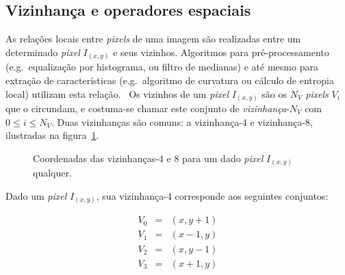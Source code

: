 \subsection{Vizinhança e operadores espaciais}

As relações locais entre \textit{pixels} de uma imagem são realizadas
entre um determinado \textit{pixel} $I_{(x,y)}$ e seus
vizinhos. Algoritmos para pré-processamento (e.g.\ equalização por
histograma, ou filtro de medianas) e até mesmo para extração de
características (e.g.\ algoritmo de curvatura ou cálculo de entropia
local) utilizam esta relação.~\cite{gonzalez} Os vizinhos de
um \textit{pixel} $I_{(x,y)}$ são os $N_V$ \textit{pixels} $V_i$ que o
circundam, e costuma-se chamar este conjunto
de \emph{vizinhança}-$N_V$ com $0 \leq i \leq N_V$. Duas vizinhanças
são comuns: a vizinhança-4 e vizinhança-8, ilustradas na figura~\ref{fig:vizinhanca}. 

\begin{figure}[ht!]
\begin{center}
      \caption{Coordenadas das vizinhanças-$4$ e $8$ para um dado \textit{pixel}
        $I_{(x,y)}$ qualquer.}
        \label{fig:vizinhanca}

\hspace{2pc}
\fonteminha
\end{center}
\end{figure}

Dado um \textit{pixel} $I_{(x,y)}$,
sua vizinhança-4 corresponde aos seguintes conjuntos:

\begin{eqnarray}
  V_0 & = & (x, y+1) \\
  V_1 & = & (x-1, y) \\
  V_2 & = & (x, y-1) \\
  V_3 & = & (x+1, y)
\end{eqnarray}

